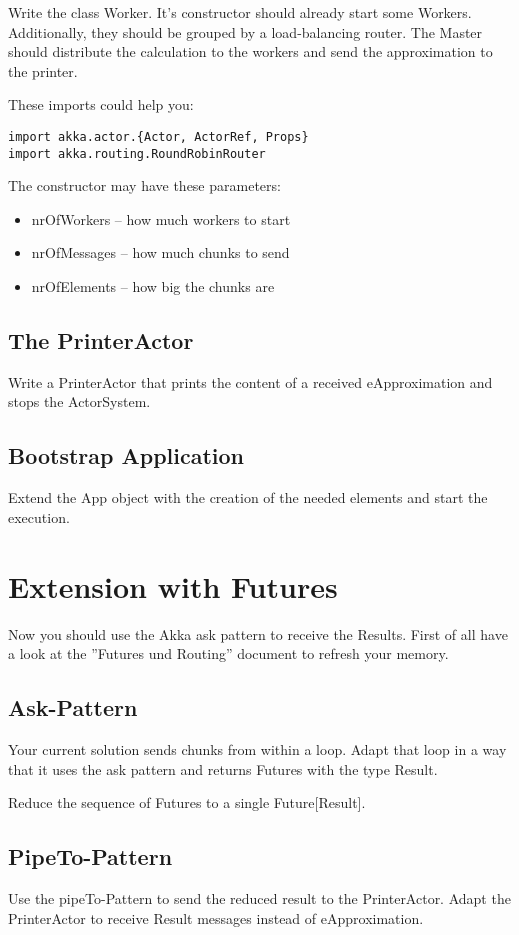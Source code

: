 \documentclass[11pt]{tudexercise}
\begin{document}
Write the class Worker. It's constructor should already start some Workers. Additionally, they should be grouped by a load-balancing router. The Master should distribute the calculation to the workers and send the approximation to the printer.

These imports could help you:
\begin{verbatim}
import akka.actor.{Actor, ActorRef, Props}
import akka.routing.RoundRobinRouter
\end{verbatim}

The constructor may have these parameters:
\begin{itemize}
\item nrOfWorkers – how much workers to start
\item nrOfMessages – how much chunks to send
\item nrOfElements – how big the chunks are
\end{itemize}

\subsection{The PrinterActor}

Write a PrinterActor that prints the content of a received  eApproximation and stops the ActorSystem.

\subsection{Bootstrap Application}

Extend the App object with the creation of the needed elements and start the execution.


\section{Extension with Futures}

Now you should use the Akka ask pattern to receive the Results. First of all have a look at the ''Futures und Routing'' document to refresh your memory.

\subsection{Ask-Pattern}
Your current solution sends chunks from within a loop. Adapt that loop in a way that it uses the ask pattern and returns Futures with the type Result.

Reduce the sequence of Futures to a single Future[Result].

\subsection{PipeTo-Pattern}
Use the pipeTo-Pattern to send the reduced result to the PrinterActor. Adapt the PrinterActor to receive Result messages instead of eApproximation.
\end{document}
